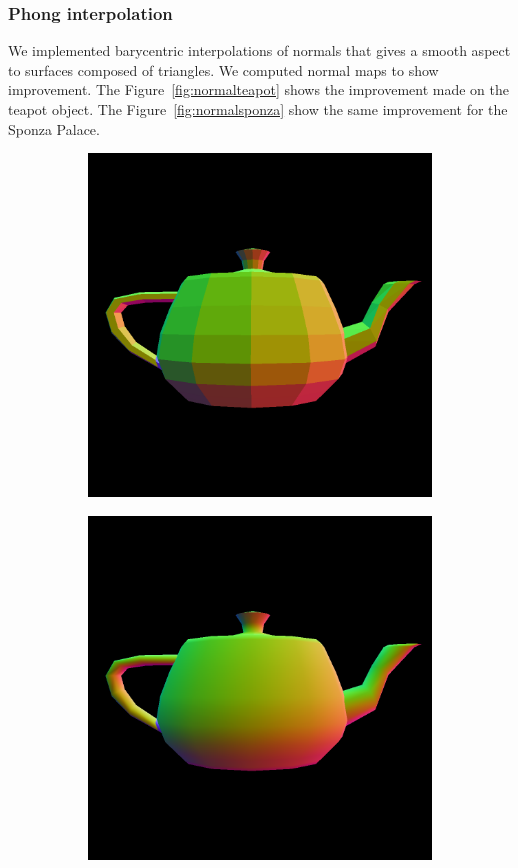 \documentclass[acmsmall]{acmart}
\begin{document}
\subsubsection*{Phong interpolation}
We implemented barycentric interpolations of normals that gives a smooth aspect to surfaces composed of triangles. We computed normal maps to show improvement.
The Figure~\ref{fig:normalteapot} shows the improvement made on the teapot object. The Figure~\ref{fig:normalsponza} show the same improvement for the Sponza Palace.
\begin{figure}[h]
    \centering
    
\begin{subfigure}{.5\textwidth}
  \centering
  \includegraphics[width=.9\linewidth]{img/nnteapot.png}
\end{subfigure}%
\begin{subfigure}{.5\textwidth}
  \centering
  \includegraphics[width=.9\linewidth]{img/nteapot.png}
\end{subfigure}    
    

\end{figure}
\end{document}
